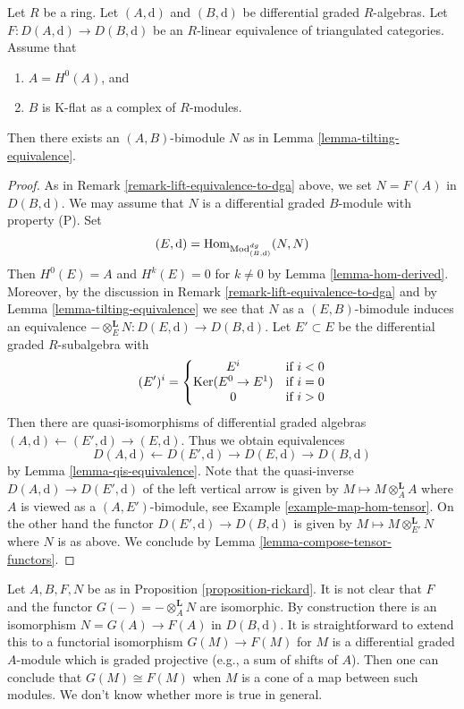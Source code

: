 \begin{proposition}
\label{proposition-rickard}
Let $R$ be a ring. Let $(A, \text{d})$ and $(B, \text{d})$ be
differential graded $R$-algebras. Let $F : D(A, \text{d}) \to D(B, \text{d})$
be an $R$-linear equivalence of triangulated categories. Assume that
\begin{enumerate}
\item $A = H^0(A)$, and
\item $B$ is K-flat as a complex of $R$-modules.
\end{enumerate}
Then there exists an $(A, B)$-bimodule $N$ as in
Lemma \ref{lemma-tilting-equivalence}.
\end{proposition}

\begin{proof}
As in Remark \ref{remark-lift-equivalence-to-dga} above, we set $N = F(A)$
in $D(B, \text{d})$. We may assume that $N$ is a differential graded
$B$-module with property (P). Set
$$
(E, \text{d}) = \mathop{\mathrm{Hom}}\nolimits_{\text{Mod}^{dg}_{(B, \text{d})}}(N, N)
$$
Then $H^0(E) = A$ and $H^k(E) = 0$ for $k \not = 0$ by
Lemma \ref{lemma-hom-derived}.
Moreover, by the discussion in Remark \ref{remark-lift-equivalence-to-dga}
and by Lemma \ref{lemma-tilting-equivalence}
we see that $N$ as a $(E, B)$-bimodule induces an
equivalence $- \otimes_E^\mathbf{L} N : D(E, \text{d}) \to D(B, \text{d})$.
Let $E' \subset E$ be the differential graded $R$-subalgebra
with
$$
(E')^i = \left\{
\begin{matrix}
E^i & \text{if }i < 0 \\
\mathop{\mathrm{Ker}}(E^0 \to E^1) & \text{if }i = 0 \\
0 & \text{if }i > 0
\end{matrix}
\right.
$$
Then there are quasi-isomorphisms of differential graded
algebras $(A, \text{d}) \leftarrow (E', \text{d}) \rightarrow (E, \text{d})$.
Thus we obtain equivalences
$$
D(A, \text{d}) \leftarrow D(E', \text{d}) \rightarrow D(E, \text{d})
\rightarrow D(B, \text{d})
$$
by Lemma \ref{lemma-qis-equivalence}.
Note that the quasi-inverse $D(A, \text{d}) \to D(E', \text{d})$
of the left vertical arrow is given
by $M \mapsto M \otimes_A^\mathbf{L} A$ where $A$ is viewed as a
$(A, E')$-bimodule, see Example \ref{example-map-hom-tensor}.
On the other hand the functor $D(E', \text{d}) \to D(B, \text{d})$ is given by
$M \mapsto M \otimes_{E'}^\mathbf{L} N$ where $N$ is as above.
We conclude by Lemma \ref{lemma-compose-tensor-functors}.
\end{proof}

\begin{remark}
\label{remark-rickard}
Let $A, B, F, N$ be as in Proposition \ref{proposition-rickard}.
It is not clear that $F$ and the functor
$G(-) = - \otimes_A^\mathbf{L} N$ are isomorphic.
By construction there is an isomorphism
$N = G(A) \to F(A)$ in $D(B, \text{d})$.
It is straightforward to extend this to a functorial isomorphism
$G(M) \to F(M)$ for $M$ is a differential graded $A$-module which
is graded projective (e.g., a sum of shifts of $A$).
Then one can conclude that $G(M) \cong F(M)$ when $M$ is a cone
of a map between such modules. We don't know whether more is true
in general.
\end{remark}


